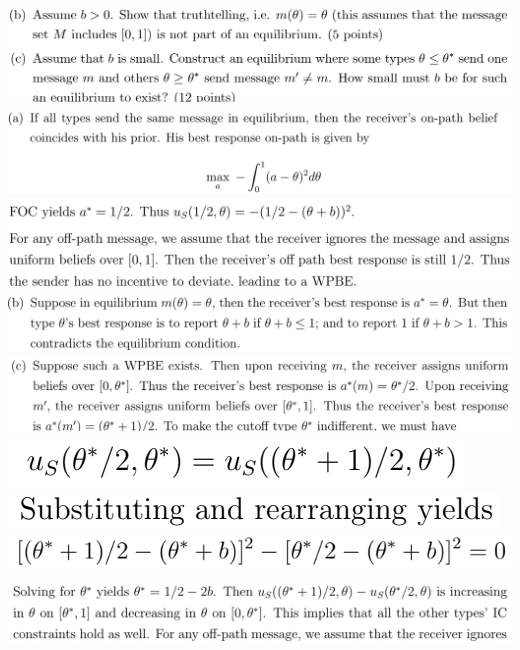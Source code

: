 \documentclass[8pt,landscape]{extarticle}
\begin{document}
\begin{multicols*}{3}
    \includegraphics[width=0.74\linewidth,keepaspectratio]{Screenshots/Screenshot 2024-03-11 195629.png}
    \includegraphics[width=0.83\linewidth,keepaspectratio]{Screenshots/Screenshot 2024-03-11 195634.png}
    \includegraphics[width=0.77\linewidth,keepaspectratio]{Screenshots/Screenshot 2024-03-11 195639.png}
    \includegraphics[width=0.81\linewidth,keepaspectratio]{Screenshots/Screenshot 2024-03-11 195651.png}
    \includegraphics[width=0.81\linewidth,keepaspectratio]{Screenshots/Screenshot 2024-03-11 195656.png}
    \includegraphics[width=0.3\linewidth,keepaspectratio]{Screenshots/Screenshot 2024-03-11 195659.png}
    \includegraphics[width=0.33\linewidth,keepaspectratio]{Screenshots/Screenshot 2024-03-11 195703.png}
    \includegraphics[width=0.43\linewidth,keepaspectratio]{Screenshots/Screenshot 2024-03-11 195707.png}
    \includegraphics[width=0.78\linewidth,keepaspectratio]{Screenshots/Screenshot 2024-03-11 195714.png}

\end{multicols*}
\end{document}
